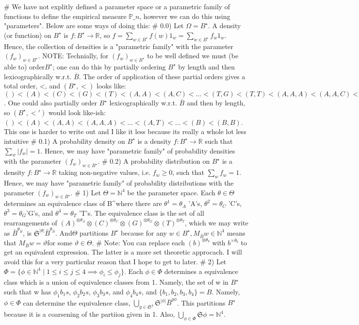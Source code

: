 # We have not explitly defined a parameter space or a parametric family of functions to define the empirical measure $\mathbb{P}\_n$, however we can do this using "parameters". Below are some ways of doing this:
# 0.0) Let $\Omega = B^\star$. A density (or function) on $B^\star$ is $f:B^\star\to\mathbb{R}$, so $f = \sum_{w \in B^\star} f(w)1_w = \sum_{w \in B^\star} f_w 1_w$. Hence, the collection of densities is a "parametric family" with the parameter $(f_w)_{w\in B^\star}$. NOTE: Technially, for $(f_w)_{w\in B^\star}$ to be well defined we must (be able to) order$ B^\star$; one can do this by partially ordering $B^\star $ by length and then lexicographically w.r.t. $\bar{B}$. The order of application of these partial orders gives a total order, <, and $(B^\star,<)$ looks like: $()<(A)<(C)<(G)<(T)<(A,A)<(A,C)<\dots<(T,G)<(T,T)<(A,A,A)<(A,A,C)<\dots<(T,T,G)<(T,T,T)\dots$. One could also partially order $B^\star$ lexicographically w.r.t. $\bar{B}$ and then by length, so $(B^\star,<')$ would look like-ish: $()<(A)<(A,A)<(A,A,A)<\dots<(A,T)<\dots<(B)<(B,B)$. This one is harder to write out and I like it less because its really a whole lot less intuitive
# 0.1) A probability density on $B^\star$ is a density $f:B^\star\to\mathbb{R} $ such that $\sum_w |f_w| = 1$. Hence, we may have "parametric family" of probability densities with the parameter $(f_w)_{w\in B^\star}$.
# 0.2) A probability distribution on $B^\star$ is a density $f:B^\star\to\mathbb{R}$ taking non-negative values, i.e. $f_w \ge 0$, such that $\sum_w f_w = 1$. Hence, we may have "parametric family" of probability distributions with the parameter $(f_w)_{w\in B^\star}$.
# 1) Let $\Theta = \mathbb{N}^4 $ be the parameter space. Each $ \theta \in \Theta $ determines an equivalence class of B^\star where there are $\theta^1=\theta_A$ 'A's, $ \theta^2=\theta_C$ 'C's, $\theta^3=\theta_G $'G's, and $\theta^4=\theta_T$ 'T's. The equivalence class is the set of all rearrangements of $(A)^{\otimes\theta_A}\otimes(C)^{\otimes\theta_C}\otimes(G)^{\otimes\theta_G}\otimes(T)^{\otimes\theta_T}$, which we may write as $ \bar{B}^{\theta_{\bar{B}}} $, is $\mathfrak{S}^{|\theta|} \bar{B}^{\theta_{\bar{B}}}$. And$ \Theta$ partitions $B^\star$ because for any $w \in B^\star, M_{\bar{B}}w \in \mathbb{N}^4$ means that $M_{\bar{B}}w = \vartheta $for some $ \vartheta\in\Theta$.
# Note: You can replace each $(b)^{\otimes\theta_b}$ with ${b}^{\times\theta_b}$ to get an equivalent expression. The latter is a more set theoretic approcach. I will avoid this for a very particular reason that I hope to get to later.
# 2) Let $ \Phi = \{ \phi\in\mathbb{N}^4 \mid 1\le i\le j\le4 \implies\phi_i\le\phi_j\}$. Each $\phi \in \Phi $ determines a equivalence class which is a union of equivalence classes from 1. Namely, the set of w in $B^\star$ such that w has $\phi_1 b_1s$, $\phi_2 b_2s$, $\phi_3 b_3s$, and $\phi_4 b_4s$, and $\{b_1,b_2,b_3,b_4\}=B$. Namely, $\phi\in\Phi $ can determine the equivalence class, $\bigcup_{g\in\mathfrak{S}^4} \mathfrak{S}^{|\phi|} \bar{B}^{g \phi }$. This partitions $B^\star$ because it is a coarsening of the partiion given in 1. Also, $\bigcup_{\phi\in\Phi} \mathfrak{S}\phi = \mathbb{N}^4$.
